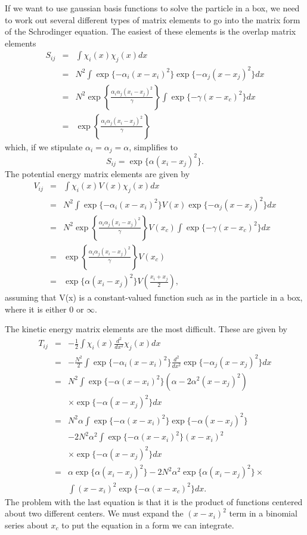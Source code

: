 If we want to use gaussian basis functions to solve the particle in a
box, we need to work out several different types of matrix elements to
go into the matrix form of the Schrodinger equation. The easiest of
these elements is the overlap matrix elements
\begin{eqnarray}
 S_{ij} &=& \int \chi_i(x)\chi_j(x)dx \\
  &=&N^2\int\exp\{-\alpha_i(x-x_i)^2\}\exp\{-\alpha_j(x-x_j)^2\}dx\\
  &=&N^2\exp\left\{\frac{\alpha_i\alpha_j(x_i-x_j)^2}{\gamma}\right\}
        \int\exp\{-\gamma(x-x_c)^2\}dx\\
  &=&\exp\left\{\frac{\alpha_i\alpha_j(x_i-x_j)^2}{\gamma}\right\}
\end{eqnarray}
which, if we stipulate $\alpha_i=\alpha_j=\alpha$, simplifies to
\begin{equation}
 S_{ij} = \exp\{\alpha(x_i-x_j)^2\}.
\end{equation}
The potential energy matrix elements are given by
\begin{eqnarray}
 V_{ij} &=& \int \chi_i(x)V(x)\chi_j(x)dx \\
  &=&N^2\int\exp\{-\alpha_i(x-x_i)^2\}V(x)\exp\{-\alpha_j(x-x_j)^2\}dx\\
  &=&N^2\exp\left\{\frac{\alpha_i\alpha_j(x_i-x_j)^2}{\gamma}\right\}V(x_c)
        \int\exp\{-\gamma(x-x_c)^2\}dx\\
  &=&\exp\left\{\frac{\alpha_i\alpha_j(x_i-x_j)^2}{\gamma}\right\}V(x_c)\\
  &=&\exp\{\alpha(x_i-x_j)^2\}V\left(\frac{x_i+x_j}{2}\right),
\end{eqnarray}
assuming that V(x) is a constant-valued function such as in the
particle in a box, where it is either 0 or $\infty$.

The kinetic energy matrix elements are the most difficult. These are
given by
\begin{eqnarray}
 T_{ij}&=& -\frac{1}{2}\int \chi_i(x)\frac{d^2}{dx^2}\chi_j(x)dx \\
  &=&-\frac{N^2}{2}\int\exp\{-\alpha_i(x-x_i)^2\}\frac{d^2}{dx^2}
         \exp\{-\alpha_j(x-x_j)^2\}dx\\
  &=&N^2\int\exp\{-\alpha(x-x_i)^2\}(\alpha-2\alpha^2(x-x_j)^2)\nonumber\\
     &&   \times\exp\{-\alpha(x-x_j)^2\}dx\\
  &=&N^2\alpha\int\exp\{-\alpha(x-x_i)^2\}\exp\{-\alpha(x-x_j)^2\}\nonumber\\ 
    &&-2N^2\alpha^2\int\exp\{-\alpha(x-x_i)^2\}(x-x_i)^2\nonumber\\
    &&\times\exp\{-\alpha(x-x_j)^2\}dx\\
  &=&\alpha\exp\{\alpha(x_i-x_j)^2\}
    -2N^2\alpha^2\exp\{\alpha(x_i-x_j)^2\}\times\nonumber\\
    &&\int(x-x_i)^2\exp\{-\alpha(x-x_c)^2\}dx.
\end{eqnarray}
The problem with the last equation is that it is the product of
functions centered about two different centers.
We must expand the $(x-x_i)^2$ term in a binomial series about $x_c$
to put the equation in a form we can integrate.

